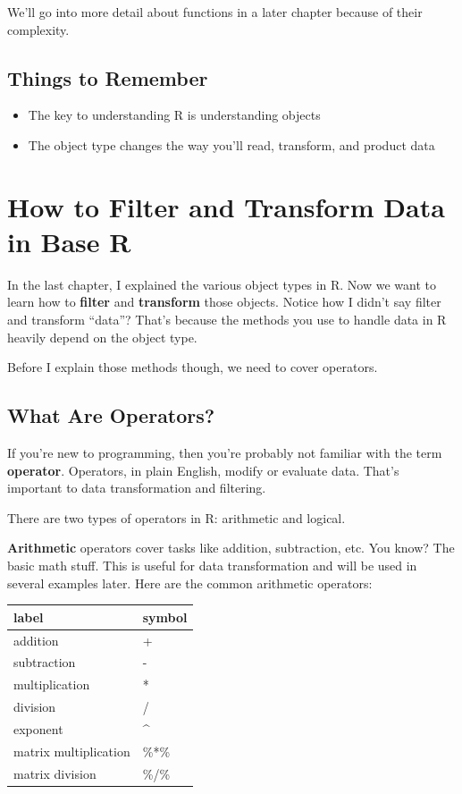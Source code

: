 \documentclass[
]{book}
\providecommand{\tightlist}{%
  \setlength{\itemsep}{0pt}\setlength{\parskip}{0pt}}
\begin{document}
We'll go into more detail about functions in a later chapter because of their complexity.

\hypertarget{things-to-remember-2}{%
\section{Things to Remember}\label{things-to-remember-2}}

\begin{itemize}
\tightlist
\item
  The key to understanding R is understanding objects
\item
  The object type changes the way you'll read, transform, and product data
\end{itemize}

\hypertarget{baserfilter}{%
\chapter{How to Filter and Transform Data in Base R}\label{baserfilter}}

In the last chapter, I explained the various object types in R. Now we want to learn how to \textbf{filter} and \textbf{transform} those objects. Notice how I didn't say filter and transform ``data''? That's because the methods you use to handle data in R heavily depend on the object type.

Before I explain those methods though, we need to cover operators.

\hypertarget{what-are-operators}{%
\section{What Are Operators?}\label{what-are-operators}}

If you're new to programming, then you're probably not familiar with the term \textbf{operator}. Operators, in plain English, modify or evaluate data. That's important to data transformation and filtering.

There are two types of operators in R: arithmetic and logical.

\textbf{Arithmetic} operators cover tasks like addition, subtraction, etc. You know? The basic math stuff. This is useful for data transformation and will be used in several examples later. Here are the common arithmetic operators:

\begin{tabular}{ll}
\toprule
label & symbol\\
\midrule
addition & +\\
subtraction & -\\
multiplication & *\\
division & /\\
exponent & \textasciicircum{}\\
\addlinespace
matrix multiplication & \%*\%\\
matrix division & \%/\%\\
\bottomrule
\end{tabular}
\end{document}

